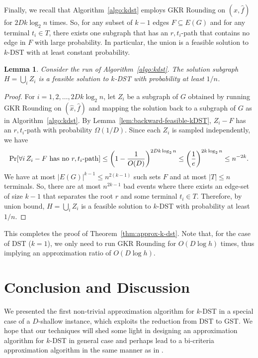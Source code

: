 \documentclass[11pt]{article}
\newtheorem{lemma}[theorem]{Lemma}
\theoremstyle{definition}
\theoremstyle{remark}
\renewcommand{\Pr}{\mathrm{\sc Pr}}
\renewcommand{\setminus}{-}
\begin{document}
Finally, we recall that Algorithm~\ref{algo:kdst} employs
GKR Rounding on $(\hat{x},\hat{f})$ for $2Dk\log_2 n$ times.
So, for any subset of $k-1$ edges $F\subseteq E(G)$
and for any terminal $t_i\in T$,
there exists one subgraph that has an $r,t_i$-path 
that contains no edge in $F$ with large probability.
In particular, the union is a feasible solution to $k$-DST
with at least constant probability.
\begin{lemma}
Consider the run of Algorithm~\ref{algo:kdst}.
The solution subgraph $H=\bigcup_iZ_i$ 
is a feasible solution to $k$-DST
with probability at least $1/n$.
\end{lemma}
\begin{proof}
For $i=1,2,\ldots,2Dk\log_2 n$, let $Z_i$ be a subgraph of $G$ 
obtained by running GKR Rounding on $(\hat{x},\hat{f})$
and mapping the solution back to a subgraph of $G$
as in Algorithm~\ref{algo:kdst}.
By Lemma~\ref{lem:backward-feasible-kDST}, $Z_i\setminus F$ 
has an $r,t_i$-path with probability $\Omega(1/D)$.
Since each $Z_i$ is sampled independently, we have
\[
\Pr[\forall i\,\mbox{$Z_i\setminus F$ has no $r,t_i$-path}]
\leq \left(1-\frac{1}{O(D)}\right)^{2Dk\log_2 n}
\leq \left(\frac{1}{e}\right)^{2k\log_2 n}
\leq n^{-2k}.
\]
We have at most $|E(G)|^{k-1}\leq n^{2(k-1)}$ such sets $F$ and
at most $|T|\leq n$ terminals.
So, there are at most $n^{2k-1}$ bad events where 
there exists an edge-set of size $k-1$ that 
separates the root $r$ and some terminal $t_i\in T$.
Therefore, by union bound, $H=\bigcup_iZ_i$ is a feasible solution 
to $k$-DST with probability at least $1/n$.
\end{proof}

This completes the proof of Theorem~\ref{thm:approx-k-dst}.
Note that, for the case of DST ($k=1$), we only need to run GKR
Rounding for $O(D\log h)$ times, thus implying an approximation ratio of
$O(D\log h)$. 

\section{Conclusion and Discussion}
\label{sec:conclusion}

We presented the first non-trivial approximation algorithm for $k$-DST
in a special case of a $D$-shallow instance, which exploits
the reduction from DST to GST. 
We hope that our techniques will shed some light in designing 
an approximation algorithm for $k$-DST in general case and
perhaps lead to a bi-criteria approximation algorithm in the same manner
as in \cite{ChalermsookGL15}.
\end{document}

